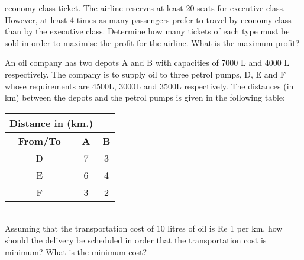economy class ticket. The airline reserves at least 20 seats for executive class.
However, at least 4 times as many passengers prefer to travel by economy class
than by the executive class. Determine how many tickets of each type must be
sold in order to maximise the profit for the airline. What is the maximum profit?\\
\item An oil company has two depots A and B with capacities of 7000 L and 4000 L
respectively. The company is to supply oil to three petrol pumps, D, E and F
whose requirements are 4500L, 3000L and 3500L respectively. The distances
(in km) between the depots and the petrol pumps is given in the following table:\\
\begin{tabular}{|c|c|c|}
\hline
 \multicolumn{2}{|l}{\textbf{Distance in (km.)}}& \\ \cline{2-3}
\hline
\textbf {From/To}&\textbf{A}&\textbf{B}\\
\hline
D&7&3\\
\hline
 E&6&4\\
 \hline 
 F&3&2\\
 \hline

\end{tabular}\\

Assuming that the transportation cost of 10 litres of oil is Re 1 per km, how
should the delivery be scheduled in order that the transportation cost is minimum?
What is the minimum cost?\\


